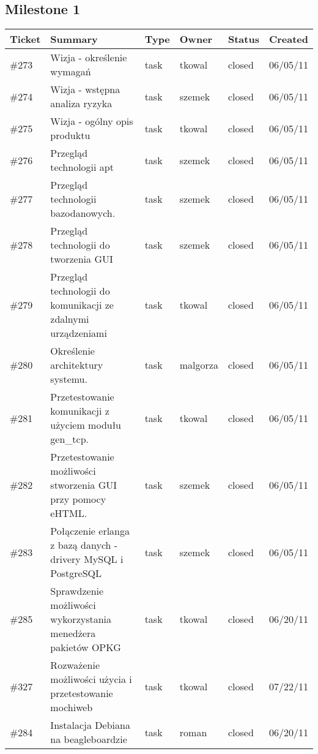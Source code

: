 \documentclass[polish,12pt]{aghthesis} \usepackage[utf8]{inputenc}
\begin{document}
\subsection{Milestone 1}
\begin{tabular}{| p{1.3cm} | p{5cm} | p{2.5cm} | p{1.5cm} | p{1.5cm} | p{1.5cm} |}
\hline
Ticket & Summary & Type & Owner & Status & Created \\ \hline
\#273 & Wizja - określenie wymagań & task & tkowal & closed & 06/05/11 \\ \hline
\#274 & Wizja - wstępna analiza ryzyka & task & szemek & closed & 06/05/11 \\ \hline
\#275 & Wizja - ogólny opis produktu & task & tkowal & closed & 06/05/11 \\ \hline
\#276 & Przegląd technologii apt & task & szemek & closed & 06/05/11 \\ \hline
\#277 & Przegląd technologii bazodanowych. & task & szemek & closed & 06/05/11 \\ \hline
\#278 & Przegląd technologii do tworzenia GUI & task & szemek & closed & 06/05/11 \\ \hline
\#279 & Przegląd technologii do komunikacji ze zdalnymi urządzeniami & task & tkowal & closed & 06/05/11 \\ \hline
\#280 & Określenie architektury systemu. & task & malgorza & closed & 06/05/11 \\ \hline
\#281 & Przetestowanie komunikacji z użyciem modułu gen\_tcp. & task & tkowal & closed & 06/05/11 \\ \hline
\#282 & Przetestowanie możliwości stworzenia GUI przy pomocy eHTML. & task & szemek & closed & 06/05/11 \\ \hline
\#283 & Połączenie erlanga z bazą danych - drivery MySQL i PostgreSQL & task & szemek & closed & 06/05/11 \\ \hline
\#285 & Sprawdzenie możliwości wykorzystania menedżera pakietów OPKG & task & tkowal & closed & 06/20/11 \\ \hline
\#327 & Rozważenie możliwości użycia i przetestowanie mochiweb & task & tkowal & closed & 07/22/11 \\ \hline
\#284 & Instalacja Debiana na beagleboardzie & task & roman & closed & 06/20/11 \\ \hline
\end{tabular}
\clearpage
\end{document}
